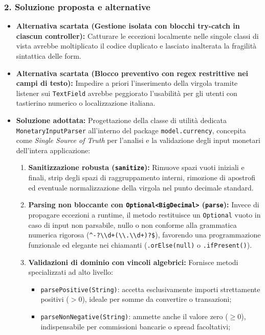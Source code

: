 \documentclass[11pt,a4paper,openright]{report}
\begin{document}
\subsubsection*{2. Soluzione proposta e alternative}
\begin{itemize}
  \item \textbf{Alternativa scartata (Gestione isolata con blocchi try-catch in ciascun controller):} Catturare le eccezioni localmente nelle singole classi di vista avrebbe moltiplicato il codice duplicato e lasciato inalterata la fragilità sintattica delle form.
  \item \textbf{Alternativa scartata (Blocco preventivo con regex restrittive nei campi di testo):} Impedire a priori l'inserimento della virgola tramite listener sui \texttt{TextField} avrebbe peggiorato l'usabilità per gli utenti con tastierino numerico o localizzazione italiana.
  \item \textbf{Soluzione adottata:} Progettazione della classe di utilità dedicata \texttt{MonetaryInputParser} all'interno del package \texttt{model.currency}, concepita come \emph{Single Source of Truth} per l'analisi e la validazione degli input monetari dell'intera applicazione:
  \begin{enumerate}
    \item \textbf{Sanitizzazione robusta (\texttt{sanitize}):} Rimuove spazi vuoti iniziali e finali, strip degli spazi di raggruppamento interni, rimozione di apostrofi ed eventuale normalizzazione della virgola nel punto decimale standard.
    \item \textbf{Parsing non bloccante con \texttt{Optional\textless BigDecimal\textgreater} (\texttt{parse}):} Invece di propagare eccezioni a runtime, il metodo restituisce un \texttt{Optional} vuoto in caso di input non parsabile, nullo o non conforme alla grammatica numerica rigorosa (\texttt{\^{}-?\textbackslash\textbackslash{}d+(\textbackslash\textbackslash{}.\textbackslash\textbackslash{}d+)?\$}), favorendo una programmazione funzionale ed elegante nei chiamanti (\texttt{.orElse(null)} o \texttt{.ifPresent()}).
    \item \textbf{Validazioni di dominio con vincoli algebrici:} Fornisce metodi specializzati ad alto livello:
    \begin{itemize}
      \item \texttt{parsePositive(String)}: accetta esclusivamente importi strettamente positivi ($> 0$), ideale per somme da convertire o transazioni;
      \item \texttt{parseNonNegative(String)}: ammette anche il valore zero ($\ge 0$), indispensabile per commissioni bancarie o spread facoltativi;

\end{itemize}
\end{enumerate}
\end{itemize}
\end{document}
